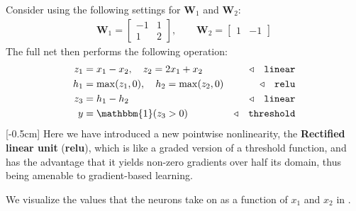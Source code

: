 Consider using the following settings for $\mathbf{W}_1$ and $\mathbf{W}_2$:
\begin{align}
    \mathbf{W}_1 = 
        \begin{bmatrix}
            -1 & 1 \\
            1 & 2
        \end{bmatrix}
    ,\quad\quad
    \mathbf{W}_2 = 
        \begin{bmatrix}
            1 & -1
        \end{bmatrix}
\end{align}
The full net then performs the following operation:
\begin{align}
    z_1 &= x_1 - x_2, \quad z_2 = 2x_1 + x_2 &\triangleleft \quad \texttt{linear}\\
    h_1 &= \max(z_1,0), \quad h_2 = \max(z_2,0) &\triangleleft \quad \texttt{relu}\\
    z_3 &= h_1-h_2 &\triangleleft \quad \texttt{linear}\\
    y &= \mathbbm{1}(z_3 > 0) &\triangleleft \quad \text{\texttt{threshold}}
\end{align}
[-0.5cm]
Here we have introduced a new pointwise nonlinearity, the \textbf{Rectified linear unit} (\textbf{relu}), which is like a graded version of a threshold function, and has the advantage that it yields non-zero gradients over half its domain, thus being amenable to gradient-based learning.

We visualize the values that the neurons take on as a function of $x_1$ and $x_2$ in \fig{\ref{fig:neural_nets:simple_MLP_network_values}}.


